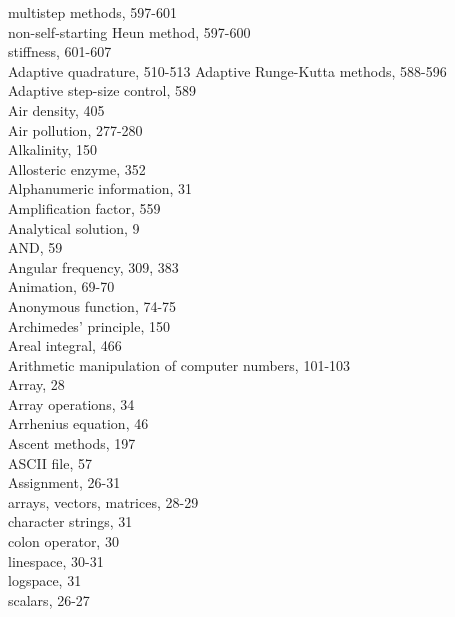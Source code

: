 \documentclass[../main.tex]{subfiles}
\begin{document}
\begin{multicols}{3}
    \hspace*{3mm}multistep methods, 597-601\\
    \hspace*{3mm}non-self-starting Heun method, 597-600\\
    \hspace*{3mm}stiffness, 601-607\\
    Adaptive quadrature, 510-513
    Adaptive Runge-Kutta methods, 588-596\\
    Adaptive step-size control, 589\\
    Air density, 405\\
    Air pollution, 277-280\\
    Alkalinity, 150\\
    Allosteric enzyme, 352\\
    Alphanumeric information, 31\\
    Amplification factor, 559\\
    Analytical solution, 9\\
    AND, 59\\
    Angular frequency, 309, 383\\
    Animation, 69-70\\
    Anonymous function, 74-75\\
    Archimedes' principle, 150\\
    Areal integral, 466\\
    Arithmetic manipulation of computer numbers, 101-103\\
    Array, 28\\
    Array operations, 34\\
    Arrhenius equation, 46\\
    Ascent methods, 197\\
    ASCII file, 57\\
    Assignment, 26-31\\
    \hspace*{3mm}arrays, vectors, matrices, 28-29\\
    \hspace*{3mm}character strings, 31\\
    \hspace*{3mm}colon operator, 30\\
    \hspace*{3mm}linespace, 30-31\\
    \hspace*{3mm}logspace, 31\\
    \hspace*{3mm}scalars, 26-27\\

\end{multicols}
\end{document}
